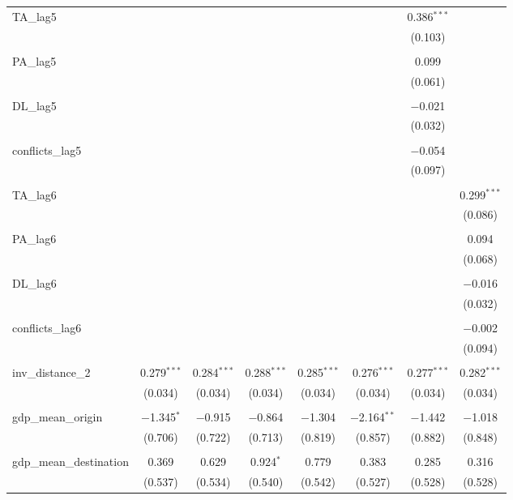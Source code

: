 \begin{table}[!htbp]
\begin{tabular}{@{\extracolsep{5pt}}lccccccc}
 TA\_lag5 &  &  &  &  &  & 0.386$^{***}$ &  \\ 
  &  &  &  &  &  & (0.103) &  \\ 
  & & & & & & & \\ 
 PA\_lag5 &  &  &  &  &  & 0.099 &  \\ 
  &  &  &  &  &  & (0.061) &  \\ 
  & & & & & & & \\ 
 DL\_lag5 &  &  &  &  &  & $-$0.021 &  \\ 
  &  &  &  &  &  & (0.032) &  \\ 
  & & & & & & & \\ 
 conflicts\_lag5 &  &  &  &  &  & $-$0.054 &  \\ 
  &  &  &  &  &  & (0.097) &  \\ 
  & & & & & & & \\ 
 TA\_lag6 &  &  &  &  &  &  & 0.299$^{***}$ \\ 
  &  &  &  &  &  &  & (0.086) \\ 
  & & & & & & & \\ 
 PA\_lag6 &  &  &  &  &  &  & 0.094 \\ 
  &  &  &  &  &  &  & (0.068) \\ 
  & & & & & & & \\ 
 DL\_lag6 &  &  &  &  &  &  & $-$0.016 \\ 
  &  &  &  &  &  &  & (0.032) \\ 
  & & & & & & & \\ 
 conflicts\_lag6 &  &  &  &  &  &  & $-$0.002 \\ 
  &  &  &  &  &  &  & (0.094) \\ 
  & & & & & & & \\ 
 inv\_distance\_2 & 0.279$^{***}$ & 0.284$^{***}$ & 0.288$^{***}$ & 0.285$^{***}$ & 0.276$^{***}$ & 0.277$^{***}$ & 0.282$^{***}$ \\ 
  & (0.034) & (0.034) & (0.034) & (0.034) & (0.034) & (0.034) & (0.034) \\ 
  & & & & & & & \\ 
 gdp\_mean\_origin & $-$1.345$^{*}$ & $-$0.915 & $-$0.864 & $-$1.304 & $-$2.164$^{**}$ & $-$1.442 & $-$1.018 \\ 
  & (0.706) & (0.722) & (0.713) & (0.819) & (0.857) & (0.882) & (0.848) \\ 
  & & & & & & & \\ 
 gdp\_mean\_destination & 0.369 & 0.629 & 0.924$^{*}$ & 0.779 & 0.383 & 0.285 & 0.316 \\ 
  & (0.537) & (0.534) & (0.540) & (0.542) & (0.527) & (0.528) & (0.528) \\ 

\end{tabular}
\end{table}
